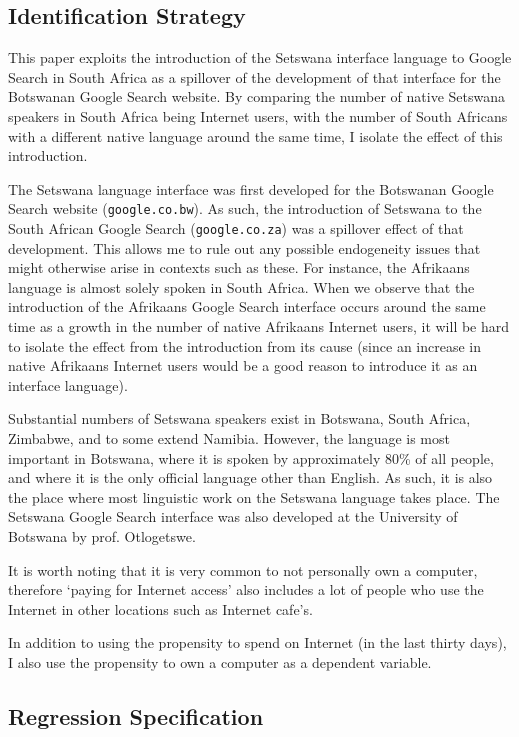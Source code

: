 \documentclass[a4paper,british]{article}\usepackage[]{graphicx}\usepackage[]{color}
\providecommand*{\code}[1]{\texttt{#1}}
\begin{document}
\subsection{Identification Strategy}

\label{subsec:identification}This paper exploits the introduction
of the Setswana interface language to Google Search in South Africa
as a spillover of the development of that interface for the Botswanan
Google Search website. By comparing the number of native Setswana
speakers in South Africa being Internet users, with the number of
South Africans with a different native language around the same time,
I isolate the effect of this introduction.

The Setswana language interface was first developed for the Botswanan
Google Search website (\code{google.co.bw}). As such, the introduction
of Setswana to the South African Google Search (\code{google.co.za})
was a spillover effect of that development. This allows me to rule
out any possible endogeneity issues that might otherwise arise in
contexts such as these. For instance, the Afrikaans language is almost
solely spoken in South Africa. When we observe that the introduction
of the Afrikaans Google Search interface occurs around the same time
as a growth in the number of native Afrikaans Internet users, it will
be hard to isolate the effect from the introduction from its cause
(since an increase in native Afrikaans Internet users would be a good
reason to introduce it as an interface language).

Substantial numbers of Setswana speakers exist in Botswana, South
Africa, Zimbabwe, and to some extend Namibia. However, the language
is most important in Botswana, where it is spoken by approximately
80\% of all people, and where it is the only official language other
than English. As such, it is also the place where most linguistic
work on the Setswana language takes place. The Setswana Google Search
interface was also developed at the University of Botswana by prof.
Otlogetswe.

It is worth noting that it is very common to not personally own a
computer, therefore `paying for Internet access' also includes a lot
of people who use the Internet in other locations such as Internet
cafe's.

In addition to using the propensity to spend on Internet (in the last
thirty days), I also use the propensity to own a computer as a dependent
variable. 

\subsection{Regression Specification}
\end{document}
